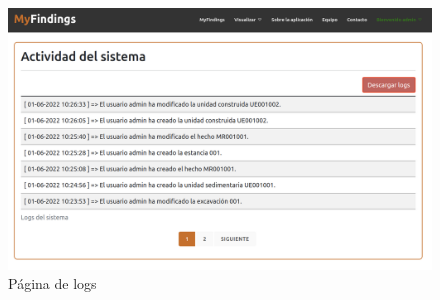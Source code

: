 \begin{enumerate}
            \begin{figure}[H]
                \centering
                \includegraphics[scale=0.20]{imagenes/logs.png}
                \caption{Página de logs}
                \label{fig:log-template}
            \end{figure}

    \end{enumerate}
